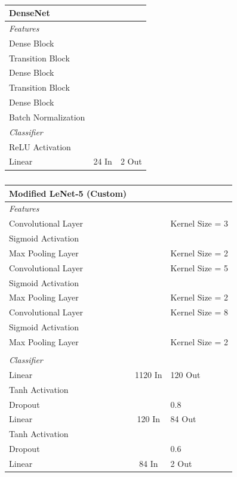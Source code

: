 \documentclass[manuscript,screen,review]{acmart}
\begin{document}
\begin{table}[h!]
\caption{}
  \label{tab:densenet}
  \begin{tabular}{lcl}
    \textbf{DenseNet} \\
    \toprule
    \textit{Features} \\
    \midrule
    Dense Block &  &  \\
    Transition Block & & \\
    Dense Block &  &  \\
    Transition Block & & \\
    Dense Block &  &  \\
    Batch Normalization & & \\
    \textit{Classifier} \\
    \midrule
    ReLU Activation &  & \\
    Linear & 24 In & 2 Out\\
    \bottomrule
\end{tabular}
\end{table}


\begin{table}[h!]
\caption{}
  \label{tab:custom}
  \begin{tabular}{lcl}
    \textbf{Modified LeNet-5 (Custom)} \\
    \toprule
    \textit{Features} \\
    \midrule
    Convolutional Layer &  & Kernel Size = 3 \\
    Sigmoid Activation & & \\
    Max Pooling Layer & & Kernel Size = 2\\
    Convolutional Layer &  & Kernel Size = 5 \\
    Sigmoid Activation & & \\
    Max Pooling Layer & & Kernel Size = 2\\
    Convolutional Layer &  & Kernel Size = 8 \\
    Sigmoid Activation & & \\
    Max Pooling Layer & & Kernel Size = 2\\
     & & \\
    \textit{Classifier} \\
    \midrule
    Linear & 1120 In & 120 Out\\
    Tanh Activation & & \\
    Dropout & & 0.8 \\
    Linear & 120 In & 84 Out\\
    Tanh Activation & & \\
    Dropout & & 0.6 \\
    Linear & 84 In & 2 Out\\
  \bottomrule
\end{tabular}
\end{table}
\end{document}
